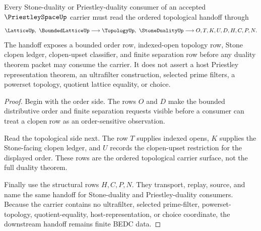 \begin{theorem}
\label{thm:priestley-space-stone-order-handoff}
Every Stone-duality or Priestley-duality consumer of an accepted $\PriestleySpaceUp$ carrier must read the ordered topological handoff through
$$
\LatticeUp,\ \BoundedLatticeUp \longrightarrow \TopologyUp,\ \StoneDualityUp \longrightarrow O,T,K,U,D,H,C,P,N .
$$
The handoff exposes a bounded order row, indexed-open topology row, Stone clopen ledger, clopen-upset classifier, and finite separation row before any duality theorem packet may consume the carrier. It does not assert a host Priestley representation theorem, an ultrafilter construction, selected prime filters, a powerset topology, quotient lattice equality, or choice.
\end{theorem}
\begin{proof}
Begin with the order side. The rows $O$ and $D$ make the bounded distributive order and finite separation requests visible before a consumer can treat a clopen row as an order-sensitive observation.

Read the topological side next. The row $T$ supplies indexed opens, $K$ supplies the Stone-facing clopen ledger, and $U$ records the clopen-upset restriction for the displayed order. These rows are the ordered topological carrier surface, not the full duality theorem.

Finally use the structural rows $H,C,P,N$. They transport, replay, source, and name the same handoff for Stone-duality and Priestley-duality consumers. Because the carrier contains no ultrafilter, selected prime-filter, powerset-topology, quotient-equality, host-representation, or choice coordinate, the downstream handoff remains finite BEDC data.
\end{proof}




